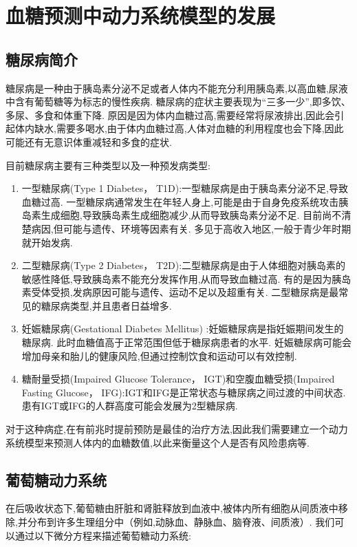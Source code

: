 \chapter{血糖预测中动力系统模型的发展}
\section{糖尿病简介}
糖尿病是一种由于胰岛素分泌不足或者人体内不能充分利用胰岛素,以高血糖,尿液中含有葡萄糖等为标志的慢性疾病. 糖尿病的症状主要表现为“三多一少”,即多饮、多尿、多食和体重下降. 原因是因为体内血糖过高,需要经常将尿液排出,因此会引起体内缺水,需要多喝水,由于体内血糖过高,人体对血糖的利用程度也会下降,因此可能还有无意识体重减轻和多食的症状. 

目前糖尿病主要有三种类型以及一种预发病类型\cite{whoDiabetes}:
\begin{enumerate}
    \item 一型糖尿病(Type 1 Diabetes， T1D):一型糖尿病是由于胰岛素分泌不足,导致血糖过高. 一型糖尿病通常发生在年轻人身上,可能是由于自身免疫系统攻击胰岛素生成细胞,导致胰岛素生成细胞减少,从而导致胰岛素分泌不足. 目前尚不清楚病因,但可能与遗传、环境等因素有关. 多见于高收入地区,一般于青少年时期就开始发病. 
    \item 二型糖尿病(Type 2 Diabetes， T2D):二型糖尿病是由于人体细胞对胰岛素的敏感性降低,导致胰岛素不能充分发挥作用,从而导致血糖过高. 有的是因为胰岛素受体受损,发病原因可能与遗传、运动不足以及超重有关. 二型糖尿病是最常见的糖尿病类型,并且患者日益增多. 
    \item 妊娠糖尿病(Gestational Diabetes Mellitus)
    :妊娠糖尿病是指妊娠期间发生的糖尿病. 此时血糖值高于正常范围但低于糖尿病患者的水平. 妊娠糖尿病可能会增加母亲和胎儿的健康风险,但通过控制饮食和运动可以有效控制. 
    \item 糖耐量受损(Impaired Glucose Tolerance， IGT)和空腹血糖受损(Impaired Fasting Glucose， IFG):IGT和IFG是正常状态与糖尿病之间过渡的中间状态. 患有IGT或IFG的人群高度可能会发展为2型糖尿病. 
\end{enumerate}

对于这种病症,在有前兆时提前预防是最佳的治疗方法,因此我们需要建立一个动力系统模型来预测人体内的血糖数值,以此来衡量这个人是否有风险患病等. 

\section{葡萄糖动力系统}
在后吸收状态下,葡萄糖由肝脏和肾脏释放到血液中,被体内所有细胞从间质液中移除,并分布到许多生理组分中（例如,动脉血、静脉血、脑脊液、间质液）. 我们可以通过以下微分方程来描述葡萄糖动力系统\cite{bergman1979quantitative}:

